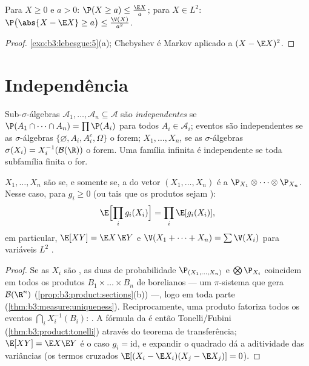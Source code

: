 \begin{proposition}
\label{prop:b3:probability:markov}
Para $X \geq 0$ e $a > 0$: $\P(X \geq a) \leq \frac{\E
X}{a}$; para $X \in L^2$: $\P\bigl(\abs{X - \E X} \geq
a\bigr) \leq \frac{\V(X)}{a^2}$.
\end{proposition}

\begin{proof}
\cref{exo:b3:lebesgue:5}(a); Chebyshev é Markov aplicado a $(X - \E X)^2$.
\end{proof}

\section{Independência}

\begin{definition}\label{def:b3:probability:independence}
Sub-$\sigma$-álgebras $\mathcal A_1, \dots, \mathcal A_n
\subseteq \mathcal A$ são
\emph{independentes} se $\P(A_1\cap\dots\cap A_n) = \prod\P(A_i)$ para todos $A_i \in
\mathcal A_i$;
eventos são independentes se as $\sigma$-álgebras $\{\varnothing, A_i, A_i^c, \Omega\}$ o forem;
 $X_1, \dots, X_n$, se as $\sigma$-álgebras $\sigma(X_i) =
X_i^{-1}(\mathcal B(\R))$ o forem. Uma
família infinita é independente se toda subfamília finita o for.
\end{definition}

\begin{theorem}\label{thm:b3:probability:independence}
$X_1, \dots, X_n$ são  se, e somente se, a  do vetor $(X_1, \dots, X_n)$ é a  $\P_{X_1}\otimes\cdots\otimes\P_{X_n}$. Nesse caso, para $g_i \geq 0$ (ou tais que os produtos sejam
):
\[
\E\Bigl[\prod_ig_i(X_i)\Bigr] = \prod_i\E[g_i(X_i)],
\]
em particular, $\E[XY] = \E X\,\E Y$ e $\V(X_1 + \dots +
X_n) = \sum\V(X_i)$ para variáveis $L^2$ .
\end{theorem}

\begin{proof}
Se as $X_i$ são , as duas  de probabilidade
$\P_{(X_1,\dots,X_n)}$ e $\bigotimes\P_{X_i}$ coincidem em todos os produtos $B_1\times\dots\times B_n$ de borelianos --- um
$\pi$-sistema que gera $\mathcal B(\R^n)$ (\cref{prop:b3:product:sections}(b)) ---, logo em toda
parte (\cref{thm:b3:measure:uniqueness}). Reciprocamente, uma  produto fatoriza todos os
eventos $\bigcap_iX_i^{-1}(B_i)$: . A fórmula da  é então
Tonelli/Fubini (\cref{thm:b3:product:tonelli}) através do teorema de transferência;
$\E[XY] = \E X\E Y$ é o caso $g_i =
\mathrm{id}$, e expandir o quadrado dá a aditividade das
variâncias (os termos cruzados $\E[(X_i - \E X_i)(X_j - \E X_j)]
= 0$).
\end{proof}

